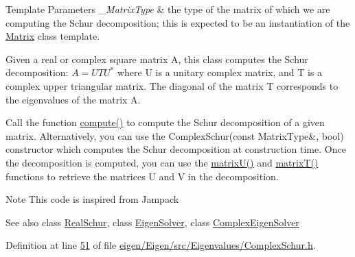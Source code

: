 \begin{DoxyTemplParams}{Template Parameters}
{\em \+\_\+\+Matrix\+Type} & the type of the matrix of which we are computing the Schur decomposition; this is expected to be an instantiation of the \hyperlink{group___core___module_class_eigen_1_1_matrix}{Matrix} class template.\\
\hline
\end{DoxyTemplParams}
Given a real or complex square matrix A, this class computes the Schur decomposition\+: $ A = U T U^*$ where U is a unitary complex matrix, and T is a complex upper triangular matrix. The diagonal of the matrix T corresponds to the eigenvalues of the matrix A.

Call the function \hyperlink{group___eigenvalues___module_a3543d2c286563108cd9ace672bbb1c09}{compute()} to compute the Schur decomposition of a given matrix. Alternatively, you can use the Complex\+Schur(const Matrix\+Type\&, bool) constructor which computes the Schur decomposition at construction time. Once the decomposition is computed, you can use the \hyperlink{group___eigenvalues___module_afed8177cf9836f032d42bdb6c6bc6e01}{matrix\+U()} and \hyperlink{group___eigenvalues___module_add3ab5ed83f7f2f06b79fa910a2d5684}{matrix\+T()} functions to retrieve the matrices U and V in the decomposition.

\begin{DoxyNote}{Note}
This code is inspired from Jampack
\end{DoxyNote}
\begin{DoxySeeAlso}{See also}
class \hyperlink{group___eigenvalues___module_class_eigen_1_1_real_schur}{Real\+Schur}, class \hyperlink{group___eigenvalues___module_class_eigen_1_1_eigen_solver}{Eigen\+Solver}, class \hyperlink{group___eigenvalues___module_class_eigen_1_1_complex_eigen_solver}{Complex\+Eigen\+Solver} 
\end{DoxySeeAlso}


Definition at line \hyperlink{eigen_2_eigen_2src_2_eigenvalues_2_complex_schur_8h_source_l00051}{51} of file \hyperlink{eigen_2_eigen_2src_2_eigenvalues_2_complex_schur_8h_source}{eigen/\+Eigen/src/\+Eigenvalues/\+Complex\+Schur.\+h}.

